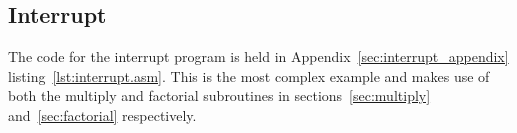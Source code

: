 





\subsection{Interrupt}
The code for the interrupt program is held in Appendix~\ref{sec:interrupt_appendix} listing~\ref{lst:interrupt.asm}.
This is the most complex example and makes use of both the multiply and factorial subroutines in sections~\ref{sec:multiply} and~\ref{sec:factorial} respectively.






